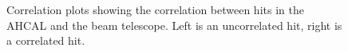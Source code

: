 \begin{figure}[h]%
	\centering
    \qquad
    \caption{Correlation plots showing the correlation between hits in the AHCAL and the beam telescope. Left is an uncorrelated hit, right is a correlated hit.}%
    \label{figure:aida/may2017/correlation}%
\end{figure}
